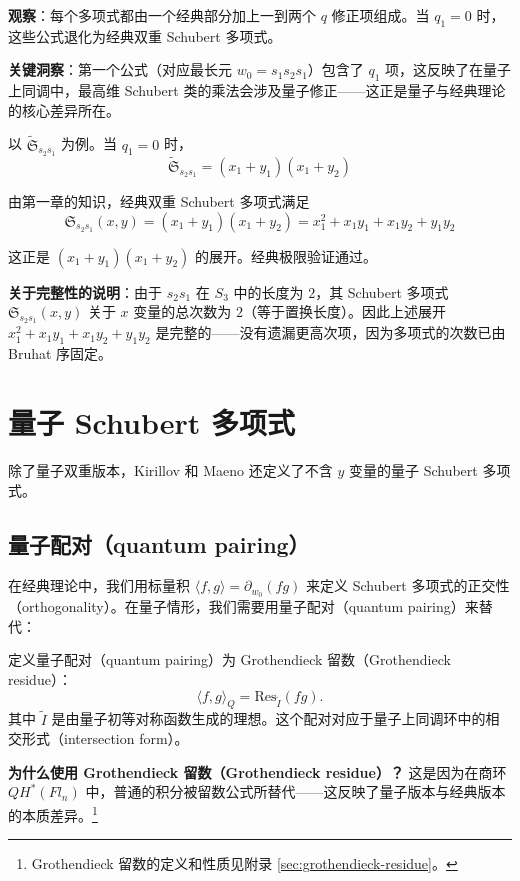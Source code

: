 \textbf{观察}：每个多项式都由一个经典部分加上一到两个 $q$ 修正项组成。当 $q_1 = 0$ 时，这些公式退化为经典双重 Schubert 多项式。

\textbf{关键洞察}：第一个公式（对应最长元 $w_0 = s_1s_2s_1$）包含了 $q_1$ 项，这反映了在量子上同调中，最高维 Schubert 类的乘法会涉及量子修正——这正是量子与经典理论的核心差异所在。

\begin{Example}[验证经典极限]
以 $\widetilde{\mathfrak{S}}_{s_2s_1}$ 为例。当 $q_1 = 0$ 时，
$$\widetilde{\mathfrak{S}}_{s_2s_1} = (x_1+y_1)(x_1+y_2)$$

由第一章的知识，经典双重 Schubert 多项式满足
$$\mathfrak{S}_{s_2s_1}(x,y) = (x_1+y_1)(x_1+y_2) = x_1^2 + x_1y_1 + x_1y_2 + y_1y_2$$

这正是 $(x_1+y_1)(x_1+y_2)$ 的展开。经典极限验证通过。

\textbf{关于完整性的说明}：由于 $s_2s_1$ 在 $S_3$ 中的长度为 $2$，其 Schubert 多项式 $\mathfrak{S}_{s_2s_1}(x,y)$ 关于 $x$ 变量的总次数为 $2$（等于置换长度）。因此上述展开 $x_1^2 + x_1y_1 + x_1y_2 + y_1y_2$ 是完整的——没有遗漏更高次项，因为多项式的次数已由 Bruhat 序固定。
\end{Example}

\section{量子 Schubert 多项式}
\label{sec:QuantumSchubertPolynomials}

除了量子双重版本，Kirillov 和 Maeno 还定义了不含 $y$ 变量的量子 Schubert 多项式。

\subsection{量子配对（quantum pairing）}

在经典理论中，我们用标量积 $\langle f, g \rangle = \partial_{w_0}(fg)$ 来定义 Schubert 多项式的正交性（orthogonality）。在量子情形，我们需要用量子配对（quantum pairing）来替代：

定义量子配对（quantum pairing）为 Grothendieck 留数（Grothendieck residue）：
\[
\langle f, g \rangle_Q = \mathrm{Res}_{\widetilde{I}}(fg).
\label{eq:QuantumPairing}
\]
其中 $\widetilde{I}$ 是由量子初等对称函数生成的理想。这个配对对应于量子上同调环中的相交形式（intersection form）。

\textbf{为什么使用 Grothendieck 留数（Grothendieck residue）？} 这是因为在商环 $QH^*(Fl_n)$ 中，普通的积分被留数公式所替代——这反映了量子版本与经典版本的本质差异。\footnote{Grothendieck 留数的定义和性质见附录 \cref{sec:grothendieck-residue}。}

